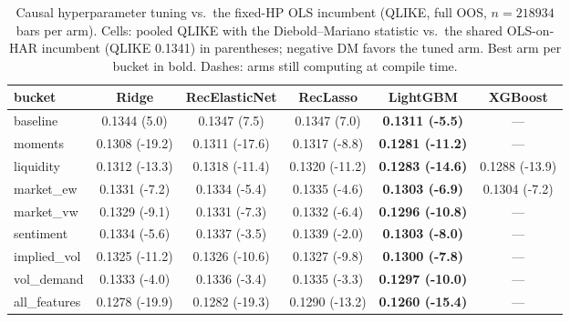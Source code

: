 \begin{table}[t]
\centering
\caption{Causal hyperparameter tuning vs.\ the fixed-HP OLS incumbent (QLIKE, full OOS, $n=218934$ bars per arm). Cells: pooled QLIKE with the Diebold--Mariano statistic vs.\ the shared OLS-on-HAR incumbent (QLIKE 0.1341) in parentheses; negative DM favors the tuned arm. Best arm per bucket in bold. Dashes: arms still computing at compile time.}
\label{tab:causal-tune-verdict}
\small
\begin{tabular}{lccccc}
\toprule
bucket & Ridge & RecElasticNet & RecLasso & LightGBM & XGBoost \\
\midrule
baseline & 0.1344 (5.0) & 0.1347 (7.5) & 0.1347 (7.0) & \textbf{0.1311 (-5.5)} & --- \\
moments & 0.1308 (-19.2) & 0.1311 (-17.6) & 0.1317 (-8.8) & \textbf{0.1281 (-11.2)} & --- \\
liquidity & 0.1312 (-13.3) & 0.1318 (-11.4) & 0.1320 (-11.2) & \textbf{0.1283 (-14.6)} & 0.1288 (-13.9) \\
market\_ew & 0.1331 (-7.2) & 0.1334 (-5.4) & 0.1335 (-4.6) & \textbf{0.1303 (-6.9)} & 0.1304 (-7.2) \\
market\_vw & 0.1329 (-9.1) & 0.1331 (-7.3) & 0.1332 (-6.4) & \textbf{0.1296 (-10.8)} & --- \\
sentiment & 0.1334 (-5.6) & 0.1337 (-3.5) & 0.1339 (-2.0) & \textbf{0.1303 (-8.0)} & --- \\
implied\_vol & 0.1325 (-11.2) & 0.1326 (-10.6) & 0.1327 (-9.8) & \textbf{0.1300 (-7.8)} & --- \\
vol\_demand & 0.1333 (-4.0) & 0.1336 (-3.4) & 0.1335 (-3.3) & \textbf{0.1297 (-10.0)} & --- \\
all\_features & 0.1278 (-19.9) & 0.1282 (-19.3) & 0.1290 (-13.2) & \textbf{0.1260 (-15.4)} & --- \\
\bottomrule
\end{tabular}
\end{table}
